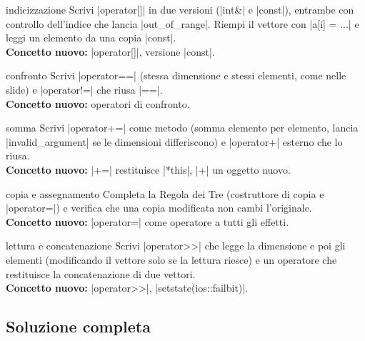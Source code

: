 \begin{step}{indicizzazione}
Scrivi \cc|operator[]| in due versioni (\cc|int&| e \cc|const|), entrambe con
controllo dell'indice che lancia \cc|out_of_range|. Riempi il vettore con \cc|a[i] = ...|
e leggi un elemento da una copia \cc|const|.\\[0.3em]
\textbf{Concetto nuovo:} \cc|operator[]|, versione \cc|const|.
\end{step}

\begin{step}{confronto}
Scrivi \cc|operator==| (stessa dimensione e stessi elementi, come nelle slide) e
\cc|operator!=| che riusa \cc|==|.\\[0.3em]
\textbf{Concetto nuovo:} operatori di confronto.
\end{step}

\begin{step}{somma}
Scrivi \cc|operator+=| come metodo (somma elemento per elemento, lancia
\cc|invalid_argument| se le dimensioni differiscono) e \cc|operator+| esterno che lo
riusa.\\[0.3em]
\textbf{Concetto nuovo:} \cc|+=| restituisce \cc|*this|, \cc|+| un oggetto nuovo.
\end{step}

\begin{step}{copia e assegnamento}
Completa la Regola dei Tre (costruttore di copia e \cc|operator=|) e verifica che una
copia modificata non cambi l'originale.\\[0.3em]
\textbf{Concetto nuovo:} \cc|operator=| come operatore a tutti gli effetti.
\end{step}

\begin{step}{lettura e concatenazione}
Scrivi \cc|operator>>| che legge la dimensione e poi gli elementi (modificando il
vettore solo se la lettura riesce) e un operatore \cc{|} che restituisce la
concatenazione di due vettori.\\[0.3em]
\textbf{Concetto nuovo:} \cc|operator>>|, \cc|setstate(ios::failbit)|.
\end{step}

\subsection*{Soluzione completa}

